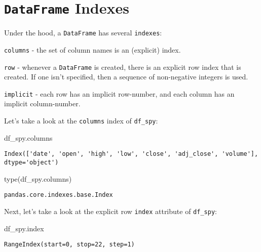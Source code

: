 \documentclass[
  letterpaper,
  DIV=11,
  numbers=noendperiod]{scrreprt}
\newenvironment{Shaded}{\begin{snugshade}}{\end{snugshade}}
\newcommand{\BuiltInTok}[1]{\textcolor[rgb]{0.00,0.23,0.31}{#1}}
\newcommand{\NormalTok}[1]{\textcolor[rgb]{0.00,0.23,0.31}{#1}}
\begin{document}
\hypertarget{dataframe-indexes}{%
\section{\texorpdfstring{\texttt{DataFrame}
Indexes}{DataFrame Indexes}}\label{dataframe-indexes}}

Under the hood, a \texttt{DataFrame} has several \texttt{indexes}:

\texttt{columns} - the set of column names is an (explicit) index.

\texttt{row} - whenever a \texttt{DataFrame} is created, there is an
explicit row index that is created. If one isn't specified, then a
sequence of non-negative integers is used.

\texttt{implicit} - each row has an implicit row-number, and each column
has an implicit column-number.

Let's take a look at the \texttt{columns} index of \texttt{df\_spy}:

\begin{Shaded}
\begin{Highlighting}[]
\NormalTok{df\_spy.columns}
\end{Highlighting}
\end{Shaded}

\begin{verbatim}
Index(['date', 'open', 'high', 'low', 'close', 'adj_close', 'volume'], dtype='object')
\end{verbatim}

\begin{Shaded}
\begin{Highlighting}[]
\BuiltInTok{type}\NormalTok{(df\_spy.columns)}
\end{Highlighting}
\end{Shaded}

\begin{verbatim}
pandas.core.indexes.base.Index
\end{verbatim}

Next, let's take a look at the explicit row \texttt{index} attribute of
\texttt{df\_spy}:

\begin{Shaded}
\begin{Highlighting}[]
\NormalTok{df\_spy.index}
\end{Highlighting}
\end{Shaded}

\begin{verbatim}
RangeIndex(start=0, stop=22, step=1)
\end{verbatim}
\end{document}
